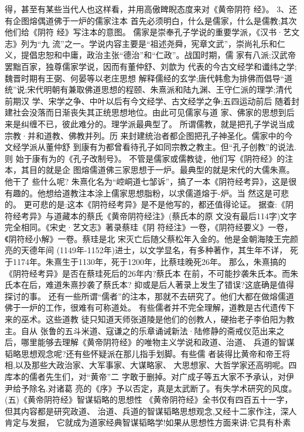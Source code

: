 \documentclass[12pt,UTF8]{ctexbook}
\begin{document}
得，甚至有某些当代人也这样看，并用高傲睥睨态度来对《黄帝阴符
经》。
3、还有企图熔偶道佛于一炉的儒家注本
首先必须明白，什么是儒家，什么是儒教;其次他们给《阴符
经》写注本的意图。
儒家是崇奉孔子学说的重要学派，《汉书·艺文志》列为“九
流”之一。学说内容主要是“祖述尧舜，宪章文武”，崇尚礼乐和仁
义，提倡忠恕和中庸，政治主张“德治”和“仁政”。战国时期，儒
家有八派;汉武帝罢黜百家，独尊儒家学说，因而有董仲舒、刘歆为
代表的今古文经学和谶纬之学;魏晋时期有王弼、何晏等以老庄思想
解释儒经的玄学;唐代韩愈为排佛而倡导“道统”说;宋代明朝有兼取佛道思想的程颐、朱熹派和陆九渊、王守仁派的理学;清代前期汉
学、宋学之争、中叶以后有今文经学、古文经学之争;五四运动前后
随着封建社会没落而日渐丧失其正统思想地位。由此可见儒家与道
家、佛家的思想到后来是纠缠不已，彼此难分的。理学派最典型了。
所谓儒教，就是把孔子学说当成宗教·并和道教、佛教并列。历
来封建统治者都企图把孔子神圣化。儒家中的今文经学派从董仲舒
到康有为都曾看待孔子如同宗教之教主。但“孔子创教”的说法.则
始于康有为的《孔子改制号》。
不管是儒家或儒教徒，他们写《阴符经》的注本，其目的就是企
图熔儒道佛三家思想于一炉。最典型的就是宋代的大儒朱熹。他干了
些什么呢?
朱熹化名为“崆峒道七邹诉”，搞了一本《阴符经考异》，这是很
有趣的。他想给道教注本涂上儒家思想脂粉，以求儒道熔于-炉。当
然这是可悲的。
更可悲的是:这本《阴符经考异》是不是他写的，都还值得论证。
据查:《阴符经考异》与道藏本的蔡氏《黄帝阴符经注》(蔡氏本的原
文没有最后114字)文字完全相同。《宋史·艺文志》著录蔡珪《阴
符经注》一卷，《阴符经要义》一卷，《阴符经小解》一卷。蔡珪是北
宋灭亡后随父蔡松年入金的。他是金朝海陵王完颜亮的天德年间
(1149年-1152年)进士，以文学显名，有多种著作，其生年不详，
死于1174年。朱熹生于1130年，死于1200年，比蔡珪晚死26年。
那么，朱熹搞的《阴符经考异》是否在蔡珪死后的26年内?蔡氏本
在前，不可能抄袭朱氏本。而朱氏本在后，难道朱熹抄袭了蔡氏本?
抑或是后人著录上发生了错误?这底确是值得探讨的事。
还有一些所谓“儒者”的注本，那就不去研究了。他们大都在做熔儒道佛于一炉的工作，很难有可称道处。
有些儒者并不完全理解，道教是古代遗传下来的巫术。这些道教
徒只知道天师张道陵是他们的创教人，硬抬老子李伯阳为教主。自从
张鲁的五斗米道、寇谦之的乐章诵诫新法·陆修静的斋戒仪范出来之
后，哪里能够去理解《黄帝阴符经》的唯物主义学说和政道、治道、
兵道的智谋韬略思想观念呢?还有些怀疑派在那儿指手划脚。有些儒
者装得比黄帝和帝王将相,以及那些大政治家、大军事家、大谋略家、
大思想家、大哲学家还高明呢。四库本的儒者先生们，对“黄帝”二
字敢于删掉。对广成子等五大家不予承认，对伊尹给予除名.对诸葛
亮的《序》予以否定，真是太武断了。有失学术研究的风度。
(五)《黄帝阴符经》智谋韬略的思想性
《黄帝阴符经》全书仅有四百五十一字，但其内容都是研究政道、
治道、兵道的智谋韬略思想观念,又经十二家作注，深人肯定与发掘，
它就成为道家经典智谋韬略学!如果从思想性方面来讲:它具有朴素
\end{document}
